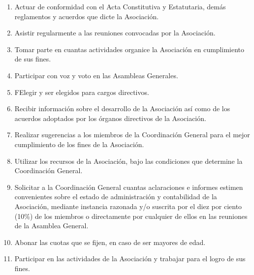         \begin{enumerate}

          \item 
            Actuar de conformidad con el Acta Constitutiva y Estatutaria,
            dem\'as reglamentos y acuerdos que dicte la Asociaci\'on.
          
          \item 
            Asistir regularmente a las reuniones convocadas por la Asociaci\'on.
          
          \item
            Tomar parte en cuantas actividades organice la Asociaci\'on en
            cumplimiento de sus fines.

          \item
            Participar con voz y voto en las Asambleas Generales.

          \item 
            FElegir y ser elegidos para cargos directivos.

          \item
            Recibir informaci\'on sobre el desarrollo de la Asociaci\'on as\'i{}
            como de los acuerdos adoptados por los \'organos directivos de la
            Asociaci\'on.

          \item
            Realizar sugerencias a los miembros de la Coordinaci\'on General
            para el mejor cumplimiento de los fines de la Asociaci\'on.

          \item
            Utilizar los recursos de la Asociaci\'on, bajo las condiciones que
            determine la Coordinaci\'on General.

          \item
            Solicitar a la Coordinaci\'on General cuantas aclaraciones e
            informes estimen convenientes sobre el estado de administraci\'on y
            contabilidad de la Asociaci\'on, mediante instancia razonada y/o
            suscrita por el diez por ciento (10\%) de los miembros o
            directamente por cualquier de ellos en las reuniones de la Asamblea
            General.

          \item
            Abonar las cuotas que se fijen, en caso de ser mayores de edad.

          \item
            Participar en las actividades de la Asociaci\'on y trabajar para el
            logro de sus fines.


\end{enumerate}
